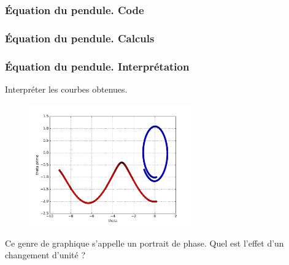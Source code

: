 \begin{frame}
  \frametitle{\'Equation du pendule. Code}

\end{frame}

\begin{frame}
  \frametitle{\'Equation du pendule. Calculs}

\end{frame}

\begin{frame}
  \frametitle{\'Equation du pendule. Interprétation}
Interpréter les courbes obtenues.
\begin{figure}[H]
  \centering
  \includegraphics[width=7cm]{./resolnumeqdiff_1.pdf}
\end{figure}
Ce genre de graphique s'appelle un portrait de phase.\newline
Quel est l'effet d'un changement d'unité ?
\end{frame}


